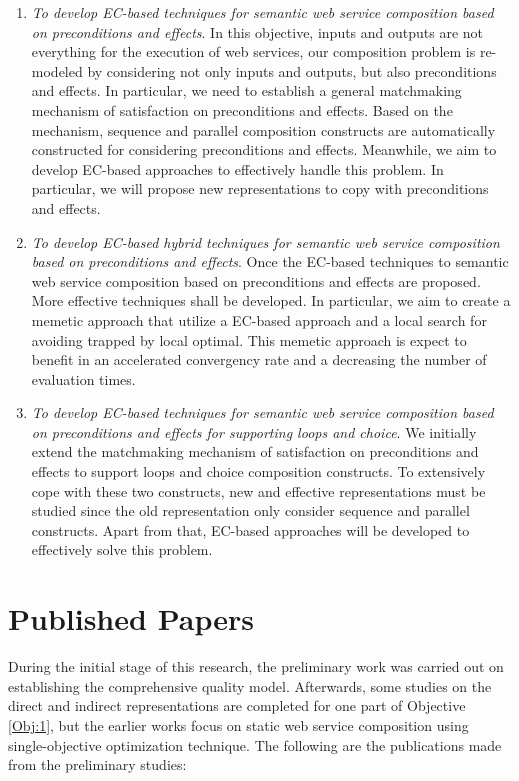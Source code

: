 \begin{enumerate}
\begin{enumerate}
  \item \emph{To develop EC-based techniques for semantic web service composition based on preconditions and effects}. In this objective, inputs and outputs are not everything for the execution of web services, our composition problem is re-modeled by considering not only inputs and outputs, but also preconditions and effects. In particular, we need to establish a general matchmaking mechanism of satisfaction on preconditions and effects. Based on the mechanism, sequence and parallel composition constructs are automatically constructed for considering preconditions and effects. Meanwhile, we aim to develop EC-based approaches to effectively handle this problem. In particular, we will propose new representations to copy with preconditions and effects.

  \item \emph{To develop EC-based hybrid techniques for semantic web service composition based on preconditions and effects}. Once the EC-based techniques to semantic web service composition based on preconditions and effects are proposed. More effective techniques shall be developed. In particular, we aim to create a memetic approach that utilize a EC-based approach and a local search for avoiding trapped by local optimal. This memetic approach is expect to benefit in an accelerated convergency rate and a decreasing the number of evaluation times.
    
   \item \emph{To develop EC-based techniques for semantic web service composition based on preconditions and effects for supporting loops and choice}. We initially extend the matchmaking mechanism of satisfaction on preconditions and effects to support loops and choice composition constructs. To extensively cope with these two constructs, new and effective representations must be studied since the old representation only consider sequence and parallel constructs. Apart from that, EC-based approaches will be developed to effectively solve this problem.

 
 \end{enumerate}
 
\end{enumerate}

\section{Published Papers}

During the initial stage of this research, the preliminary work was carried out on establishing the comprehensive quality model.  Afterwards, some studies on the direct and indirect representations are completed for one part of Objective \ref{Obj:1}, but the earlier works focus on static web service composition using single-objective optimization technique. The following are the publications made from the preliminary studies:

